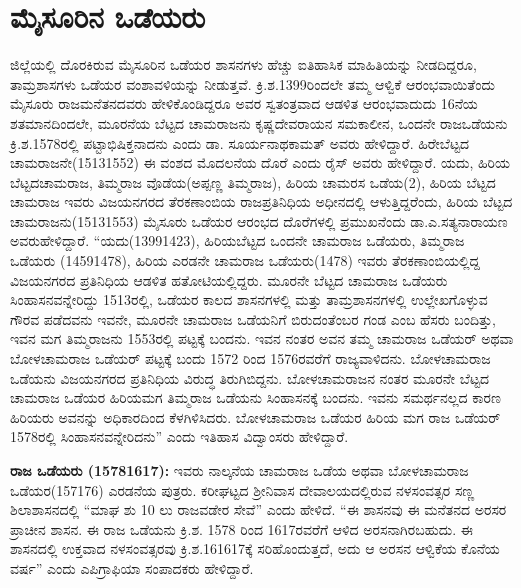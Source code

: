 \section{ಮೈಸೂರಿನ ಒಡೆಯರು}

ಜಿಲ್ಲೆಯಲ್ಲಿ ದೊರಕಿರುವ ಮೈಸೂರಿನ ಒಡೆಯರ ಶಾಸನಗಳು ಹೆಚ್ಚು ಐತಿಹಾಸಿಕ ಮಾಹಿತಿಯನ್ನು ನೀಡದಿದ್ದರೂ, ತಾಮ್ರಶಾಸಗಳು ಒಡೆಯರ ವಂಶಾವಳಿಯನ್ನು ನೀಡುತ್ತವೆ. ಕ್ರಿ.ಶ.1399ರಿಂದಲೇ ತಮ್ಮ ಆಳ್ವಿಕೆ ಆರಂಭವಾಯಿತೆಂದು ಮೈಸೂರು ರಾಜಮನೆತನ\-ದವರು ಹೇಳಿಕೊಂಡಿದ್ದರೂ ಅವರ ಸ್ವತಂತ್ರವಾದ ಆಡಳಿತ ಆರಂಭವಾದುದು 16ನೆಯ ಶತಮಾನದಿಂದಲೇ, ಮೂರನೆಯ ಬೆಟ್ಟದ ಚಾಮರಾಜನು ಕೃಷ್ಣದೇವರಾಯನ ಸಮಕಾಲೀನ, ಒಂದನೇ ರಾಜಒಡೆಯನು ಕ್ರಿ.ಶ.1578ರಲ್ಲಿ ಪಟ್ಟಾಭಿಷಿಕ್ತನಾದನು ಎಂದು ಡಾ. ಸೂರ್ಯನಾಥಕಾಮತ್​ ಅವರು ಹೇಳಿದ್ದಾರೆ. ಹಿರೇಬೆಟ್ಟದ ಚಾಮರಾಜನೇ(1513\enginline{-}1552) ಈ ವಂಶದ ಮೊದಲನೆಯ ದೊರೆ ಎಂದು ರೈಸ್​ ಅವರು ಹೇಳಿದ್ದಾರೆ. ಯದು, ಹಿರಿಯ ಬೆಟ್ಟದಚಾಮರಾಜ, ತಿಮ್ಮರಾಜ ವೊಡೆಯ(ಅಪ್ಪಣ್ಣ ತಿಮ್ಮರಾಜ), ಹಿರಿಯ ಚಾಮರಸ ಒಡೆಯ(2), ಹಿರಿಯ ಬೆಟ್ಟದ ಚಾಮರಾಜ ಇವರು ವಿಜಯನಗರದ ತೆರಕಣಾಂಬಿಯ ರಾಜಪ್ರತಿನಿಧಿಯ ಅಧೀನದಲ್ಲಿ ಆಳುತ್ತಿದ್ದರೆಂದು, ಹಿರಿಯ ಬೆಟ್ಟದ ಚಾಮರಾಜನು\break (1513\enginline{-}1553) ಮೈಸೂರು ಒಡೆಯರ ಆರಂಭದ ದೊರೆಗಳಲ್ಲಿ ಪ್ರಮುಖನೆಂದು ಡಾ.ಎ.ಸತ್ಯನಾರಾಯಣ ಅವರು\break ಹೇಳಿದ್ದಾರೆ. “ಯದು(1399\enginline{-}1423), ಹಿರಿಯಬೆಟ್ಟದ ಒಂದನೇ ಚಾಮರಾಜ ಒಡೆಯರು, ತಿಮ್ಮರಾಜ ಒಡೆಯರು (1459\enginline{-}1478), ಹಿರಿಯ ಎರಡನೇ ಚಾಮರಾಜ ಒಡೆಯರು(1478) ಇವರು ತೆರಕಣಾಂಬಿಯಲ್ಲಿದ್ದ ವಿಜಯನಗರದ ಪ್ರತಿನಿಧಿಯ ಆಡಳಿತ ಹತೋಟಿಯಲ್ಲಿದ್ದರು. ಮೂರನೇ ಬೆಟ್ಟದ ಚಾಮರಾಜ ಒಡೆಯರು ಸಿಂಹಾಸನವನ್ನೇರಿದ್ದು 1513ರಲ್ಲಿ, ಒಡೆಯರ ಕಾಲದ ಶಾಸನಗಳಲ್ಲಿ ಮತ್ತು ತಾಮ್ರಶಾಸನಗಳಲ್ಲಿ ಉಲ್ಲೇಖಗೊಳ್ಳುವ ಗೌರವ ಪಡೆದವನು ಇವನೇ, ಮೂರನೇ ಚಾಮರಾಜ ಒಡೆಯನಿಗೆ ಬಿರುದಂತೆಂಬರ ಗಂಡ ಎಂಬ ಹೆಸರು ಬಂದಿತ್ತು, ಇವನ ಮಗ ತಿಮ್ಮರಾಜನು 1553ರಲ್ಲಿ ಪಟ್ಟಕ್ಕೆ ಬಂದನು. ಇವನ ನಂತರ ಅವನ ತಮ್ಮ ಚಾಮರಾಜ ಒಡೆಯರ್​ ಅಥವಾ ಬೋಳಚಾಮರಾಜ ಒಡೆಯರ್​ ಪಟ್ಟಕ್ಕೆ ಬಂದು 1572 ರಿಂದ 1576ರವರೆಗೆ ರಾಜ್ಯವಾಳಿದನು. ಬೋಳಚಾಮರಾಜ ಒಡೆಯನು ವಿಜಯನಗರದ ಪ್ರತಿನಿಧಿಯ ವಿರುದ್ಧ ತಿರುಗಿಬಿದ್ದನು. ಬೋಳಚಾಮರಾಜನ ನಂತರ ಮೂರನೇ ಬೆಟ್ಟದ ಚಾಮರಾಜ ಒಡೆಯರ ಹಿರಿಯಮಗ ತಿಮ್ಮರಾಜ ಒಡೆಯನು ಸಿಂಹಾಸನಕ್ಕೆ ಬಂದನು. ಇವನು ಸಮರ್ಥನಲ್ಲದ ಕಾರಣ ಹಿರಿಯರು ಅವನನ್ನು ಅಧಿಕಾರದಿಂದ ಕೆಳಗಿಳಿಸಿದರು. ಬೋಳಚಾಮರಾಜ ಒಡೆಯರ ಹಿರಿಯ ಮಗ ರಾಜ ಒಡೆಯರ್​ 1578ರಲ್ಲಿ ಸಿಂಹಾಸನವನ್ನೇರಿದನು” ಎಂದು ಇತಿಹಾಸ ವಿದ್ವಾಂಸರು ಹೇಳಿದ್ದಾರೆ.

\textbf{ರಾಜ ಒಡೆಯರು (1578\general{\enginline{-}}1617): } ಇವರು ನಾಲ್ಕನೆಯ ಚಾಮರಾಜ ಒಡೆಯ ಅಥವಾ ಬೋಳಚಾಮರಾಜ ಒಡೆಯರ(1571\enginline{-}76) ಎರಡನೆಯ ಪುತ್ರರು. ಕರೀಘಟ್ಟದ ಶ‍್ರೀನಿವಾಸ ದೇವಾಲಯದಲ್ಲಿರುವ ನಳಸಂವತ್ಸರ ಸಣ್ಣ ಶಿಲಾಶಾಸನದಲ್ಲಿ “ಮಾಘ ಶು 10 ಲು ರಾಜವಡೇರ ಸೇವೆ” ಎಂದು ಹೇಳಿದೆ. “ಈ ಶಾಸನವು ಈ ಮನೆತನದ ಅರಸರ ಪ್ರಾಚೀನ ಶಾಸನ. ಈ ರಾಜ ಒಡೆಯನು ಕ್ರಿ.ಶ. 1578 ರಿಂದ 1617ರವರೆಗೆ ಆಳಿದ ಅರಸನಾಗಿರಬಹುದು. ಈ ಶಾಸನದಲ್ಲಿ ಉಕ್ತವಾದ ನಳಸಂವತ್ಸರವು ಕ್ರಿ.ಶ.1616\enginline{-}17ಕ್ಕೆ ಸರಿಹೊಂದುತ್ತದೆ, ಅದು ಆ ಅರಸನ ಆಳ್ವಿಕೆಯ ಕೊನೆಯ ವರ್ಷ” ಎಂದು ಎಪಿಗ್ರಾಫಿಯಾ ಸಂಪಾದಕರು ಹೇಳಿದ್ದಾರೆ.

